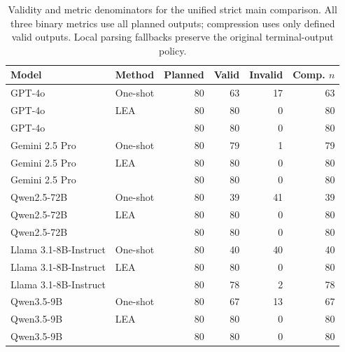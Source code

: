 \begin{table}[t]
\centering\small
\begin{tabular}{llrrrr}
\toprule
Model & Method & Planned & Valid & Invalid & Comp. $n$ \\
\midrule
GPT-4o & One-shot & 80 & 63 & 17 & 63 \\
GPT-4o & LEA & 80 & 80 & 0 & 80 \\
GPT-4o & \samcgs{} & 80 & 80 & 0 & 80 \\
Gemini 2.5 Pro & One-shot & 80 & 79 & 1 & 79 \\
Gemini 2.5 Pro & LEA & 80 & 80 & 0 & 80 \\
Gemini 2.5 Pro & \samcgs{} & 80 & 80 & 0 & 80 \\
Qwen2.5-72B & One-shot & 80 & 39 & 41 & 39 \\
Qwen2.5-72B & LEA & 80 & 80 & 0 & 80 \\
Qwen2.5-72B & \samcgs{} & 80 & 80 & 0 & 80 \\
Llama 3.1-8B-Instruct & One-shot & 80 & 40 & 40 & 40 \\
Llama 3.1-8B-Instruct & LEA & 80 & 80 & 0 & 80 \\
Llama 3.1-8B-Instruct & \samcgs{} & 80 & 78 & 2 & 78 \\
Qwen3.5-9B & One-shot & 80 & 67 & 13 & 67 \\
Qwen3.5-9B & LEA & 80 & 80 & 0 & 80 \\
Qwen3.5-9B & \samcgs{} & 80 & 80 & 0 & 80 \\
\bottomrule\end{tabular}
\caption{Validity and metric denominators for the unified strict main comparison. All three binary metrics use all planned outputs; compression uses only defined valid outputs. Local parsing fallbacks preserve the original terminal-output policy.}
\label{tab:unified_scoring_denominators}
\end{table}
